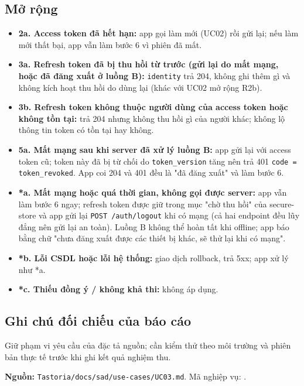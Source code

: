 \subsection{Mở rộng}
\begin{itemize}
\item \textbf{2a. Access token đã hết hạn:} app gọi làm mới (UC02) rồi gửi lại; nếu làm mới thất bại, app vẫn làm bước 6 vì phiên đã mất.
\item \textbf{3a. Refresh token đã bị thu hồi từ trước (gửi lại do mất mạng, hoặc đã đăng xuất ở luồng B):} {\small\texttt{identity}} trả 204, không ghi thêm gì và không kích hoạt thu hồi do dùng lại (khác với UC02 mở rộng R2b).
\item \textbf{3b. Refresh token không thuộc người dùng của access token hoặc không tồn tại:} trả 204 nhưng không thu hồi gì của người khác; không lộ thông tin token có tồn tại hay không.
\item \textbf{5a. Mất mạng sau khi server đã xử lý luồng B:} app gửi lại với access token cũ; token này đã bị từ chối do {\small\texttt{token\_\allowbreak{}\allowbreak{}version}} tăng nên trả 401 {\small\texttt{code = token\_\allowbreak{}\allowbreak{}revoked}}. App coi 204 và 401 đều là "đã đăng xuất" và làm bước 6.
\item \textbf{*a. Mất mạng hoặc quá thời gian, không gọi được server:} app vẫn làm bước 6 ngay; refresh token được giữ trong mục "chờ thu hồi" của secure-\allowbreak{}store và app gửi lại {\small\texttt{POST /\allowbreak{}\allowbreak{}auth/\allowbreak{}\allowbreak{}logout}} khi có mạng (cả hai endpoint đều lũy đẳng nên gửi lại an toàn). Luồng B không thể hoàn tất khi offline; app báo bằng chữ "chưa đăng xuất được các thiết bị khác, sẽ thử lại khi có mạng".
\item \textbf{*b. Lỗi CSDL hoặc lỗi hệ thống:} giao dịch rollback, trả 5xx; app xử lý như *a.
\item \textbf{*c. Thiếu đồng ý /\allowbreak{} không khả thi:} không áp dụng.
\end{itemize}
\subsection{Ghi chú đối chiếu của báo cáo}
Giữ phạm vi yêu cầu của đặc tả nguồn; cần kiểm thử theo môi trường và phiên bản thực tế trước khi ghi kết quả nghiệm thu.

\textbf{Nguồn:} {\small\texttt{Tastoria/\allowbreak{}\allowbreak{}docs/\allowbreak{}\allowbreak{}sad/\allowbreak{}\allowbreak{}use-\allowbreak{}cases/\allowbreak{}\allowbreak{}UC03.\allowbreak{}md}}. Mã nghiệp vụ: .

